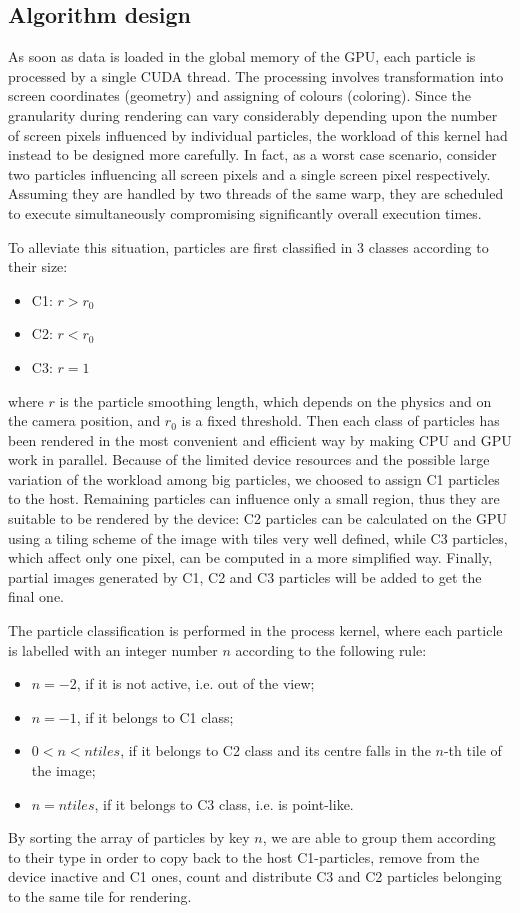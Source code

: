 \documentclass[11pt]{article}
\begin{document}
\subsection{Algorithm design}


As soon as data is loaded in the global memory of the GPU, each particle is processed by a single CUDA thread. The processing involves transformation into screen coordinates (geometry) and assigning of colours (coloring).  
Since the granularity during rendering can vary considerably depending upon the number of screen pixels influenced by individual particles, the workload of this kernel had instead to be designed more carefully.
In fact, as a worst case scenario, consider two particles influencing all screen pixels and a single screen pixel
respectively. Assuming they are handled by two threads of the same warp, they are scheduled to execute simultaneously compromising significantly overall execution times.

To alleviate this situation, particles are first classified in 3 classes according to their size:
\begin{itemize}
\item 
C1: $r > r_0$
\item
C2: $r < r_0$
\item
C3: $r = 1$
\end{itemize}
where $r$ is the particle smoothing length, which depends on the physics and on the camera position, and $r_0$ is a fixed threshold. Then each class of particles has been rendered in the most convenient and efficient way by making CPU and GPU work in parallel. Because of the limited device resources and the possible large variation of the workload among big particles, we choosed to assign C1 particles to the host. Remaining particles can influence only a small region, thus they are suitable to be rendered by the device: C2 particles can be calculated on the GPU using a tiling scheme of the image with tiles very well defined, while C3 particles, which affect only one pixel, can be computed in a more simplified way. Finally, partial images generated by C1, C2 and C3 particles will be added to get the final one. 

The particle classification is performed in the process kernel, where each particle is labelled with an integer number $n$ according to the following rule:
\begin{itemize}
\item 
$n = -2$, if it is not active, i.e. out of the view;
\item
$n = -1$, if it belongs to C1 class; 
\item
$0 < n < ntiles$, if it belongs to C2 class and its centre falls in the $n$-th tile of the image;  
\item
$n = ntiles$, if it belongs to C3 class, i.e. is point-like.
\end{itemize}
By sorting the array of particles by key $n$, we are able to group them according to their type in order to copy back to the host C1-particles, remove from the device inactive and C1 ones, count and distribute C3 and C2 particles belonging to the same tile for rendering. 
\end{document}
